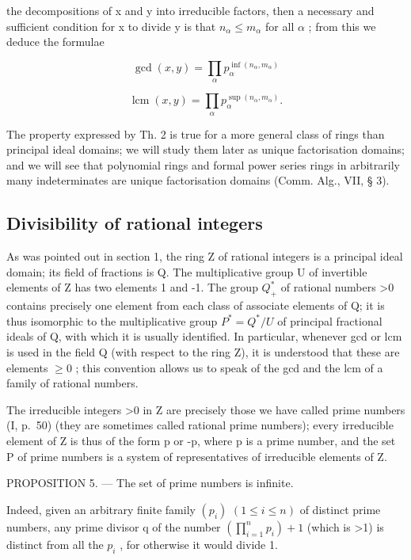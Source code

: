 the decompositions of x and y into irreducible factors, then a necessary and sufficient condition for x to divide y is that \(n_{\alpha} \leqslant m_{\alpha}\) for all \(\alpha\) ; from this we deduce the formulae

\[
\operatorname * {g c d} (x, y) = \prod_ {\alpha} p _ {\alpha} ^ {\inf (n _ {\alpha}, m _ {\alpha})}\tag{2}
\]

\[
\operatorname{lcm} (x, y) = \prod_ {\alpha} p _ {\alpha} ^ {\sup \left(n _ {\alpha}, m _ {\alpha}\right)}.\tag{3}
\]

The property expressed by Th. 2 is true for a more general class of rings than principal ideal domains; we will study them later as unique factorisation domains; and we will see that polynomial rings and formal power series rings in arbitrarily many indeterminates are unique factorisation domains (Comm. Alg., VII, § 3).

\subsection{Divisibility of rational integers}

As was pointed out in section 1, the ring Z of rational integers is a principal ideal domain; its field of fractions is Q. The multiplicative group U of invertible elements of Z has two elements 1 and -1. The group \(Q_{+}^{*}\) of rational numbers \textgreater0 contains precisely one element from each class of associate elements of Q; it is thus isomorphic to the multiplicative group \(P^{*} = Q^{*}/U\) of principal fractional ideals of Q, with which it is usually identified. In particular, whenever gcd or lcm is used in the field Q (with respect to the ring Z), it is understood that these are elements \(\geqslant 0\) ; this convention allows us to speak of the gcd and the lcm of a family of rational numbers.

The irreducible integers \textgreater0 in Z are precisely those we have called prime numbers (I, p.~50) (they are sometimes called rational prime numbers); every irreducible element of Z is thus of the form p or -p, where p is a prime number, and the set P of prime numbers is a system of representatives of irreducible elements of Z.

PROPOSITION 5. --- The set of prime numbers is infinite.

Indeed, given an arbitrary finite family \((p_{i})\) \((1 \leqslant i \leqslant n)\) of distinct prime numbers, any prime divisor q of the number \(\left(\prod_{i=1}^{n} p_{i}\right) + 1\) (which is \textgreater1) is distinct from all the \(p_{i}\) , for otherwise it would divide 1.

